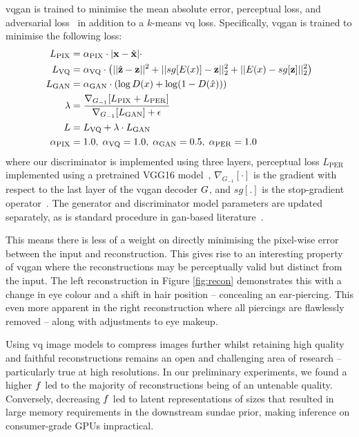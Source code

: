 \Gls{vqgan} is trained to minimise the mean absolute error, perceptual loss, and 
adversarial loss~\cite{esser2021taming} in addition to a $k$-means \gls{vq}
loss. Specifically, \gls{vqgan} is trained to minimise the following
loss:
\begin{align}
\begin{split}
    L_\text{PIX} &= \alpha_\text{PIX} \cdot |\mathbf{x} - \hat{\mathbf{x}}| \cdot \\
    L_\text{VQ} &= \alpha_\text{VQ} \cdot \left(||\hat{\mathbf{z}} -
    \mathbf{z}||^2 + ||sg[E(x)] - \mathbf{z}||^2_2 + ||E(x) -
    sg[\mathbf{z}]||^2_2\right)\\
    L_\text{GAN} &= \alpha_\text{GAN} \cdot \left(\log D(x) + \log
    (1-D(\hat{x}))\right) \\
    \lambda &= \frac{\nabla_{G_{-1}}[L_\text{PIX} +
    L_\text{PER}]}{\nabla_{G_{-1}}[L_\text{GAN}] + \epsilon}\\
    L &= L_\text{VQ} + \lambda \cdot L_\text{GAN}\\
    \alpha_\text{PIX} &= 1.0,\; \alpha_\text{VQ} = 1.0,\; \alpha_\text{GAN} = 0.5,\; \alpha_\text{PER} = 1.0
\end{split}
\end{align}
\cite{esser2021taming} where our discriminator is implemented using three
layers, perceptual loss $L_\text{PER}$ implemented using a pretrained VGG16
model~\cite{karen2014vg18}, $\nabla_{G_{-1}}[\cdot]$ is the gradient with
respect to the last layer of the \gls{vqgan} decoder $G$, and
$sg[.]$ is the stop-gradient operator~\cite{oord2017vqvae}. The
generator and discriminator model parameters are updated separately, as is
standard procedure in \gls{gan}-based literature~\cite{esser2021taming}.

This means there is less of a weight on directly minimising the pixel-wise error
between the input and reconstruction. This gives rise to an interesting property
of \gls{vqgan} where the reconstructions may be perceptually valid but 
distinct from the input. The left reconstruction in Figure \ref{fig:recon}
demonstrates this with a change in eye colour and a shift in hair position --
concealing an ear-piercing. This even more apparent in the right reconstruction
where all piercings are flawlessly removed -- along with adjustments to eye
makeup.

Using \gls{vq} image models to compress images further whilst retaining high
quality and faithful reconstructions remains an open and challenging area of
research -- particularly true at high resolutions. In our preliminary
experiments, we found a higher $f$ led to the majority of
reconstructions being of an untenable quality. Conversely, decreasing
$f$ led to latent representations of sizes that resulted in large
memory requirements in the downstream \gls{sundae} prior, making inference on
consumer-grade GPUs impractical.

